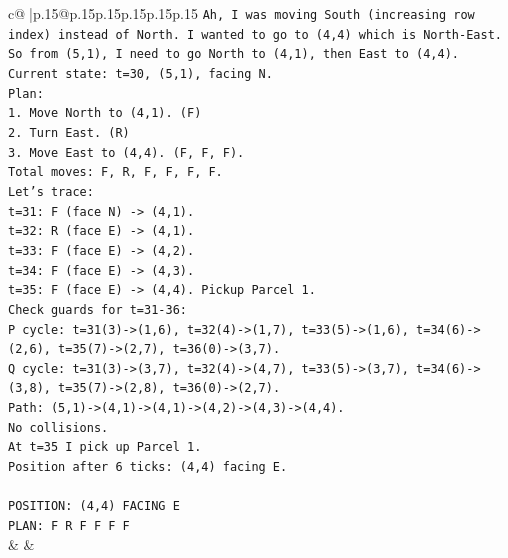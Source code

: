 \documentclass{article}
\begin{document}
{\begin{supertabular}{c@{$\;$}|p{.15\linewidth}@{}p{.15\linewidth}p{.15\linewidth}p{.15\linewidth}p{.15\linewidth}p{.15\linewidth}}
{{{\texttt{Ah, I was moving South (increasing row index) instead of North. I wanted to go to (4,4) which is North{-}East.} \\
\texttt{So from (5,1), I need to go North to (4,1), then East to (4,4).} \\
\texttt{Current state: t=30, (5,1), facing N.} \\
\texttt{Plan:} \\
\texttt{1. Move North to (4,1). (F)} \\
\texttt{2. Turn East. (R)} \\
\texttt{3. Move East to (4,4). (F, F, F).} \\
\texttt{Total moves: F, R, F, F, F, F.} \\
\texttt{Let's trace:} \\
\texttt{t=31: F (face N) {-}> (4,1).} \\
\texttt{t=32: R (face E) {-}> (4,1).} \\
\texttt{t=33: F (face E) {-}> (4,2).} \\
\texttt{t=34: F (face E) {-}> (4,3).} \\
\texttt{t=35: F (face E) {-}> (4,4). Pickup Parcel 1.} \\
\texttt{Check guards for t=31{-}36:} \\
\texttt{P cycle: t=31(3){-}>(1,6), t=32(4){-}>(1,7), t=33(5){-}>(1,6), t=34(6){-}>(2,6), t=35(7){-}>(2,7), t=36(0){-}>(3,7).} \\
\texttt{Q cycle: t=31(3){-}>(3,7), t=32(4){-}>(4,7), t=33(5){-}>(3,7), t=34(6){-}>(3,8), t=35(7){-}>(2,8), t=36(0){-}>(2,7).} \\
\texttt{Path: (5,1){-}>(4,1){-}>(4,1){-}>(4,2){-}>(4,3){-}>(4,4).} \\
\texttt{No collisions.} \\
\texttt{At t=35 I pick up Parcel 1.} \\
\texttt{Position after 6 ticks: (4,4) facing E.} \\
\\ 
\texttt{POSITION: (4,4) FACING E} \\
\texttt{PLAN: F R F F F F} \\
            }
        }
    }
    & & \\ \\


\end{supertabular}}
\end{document}
